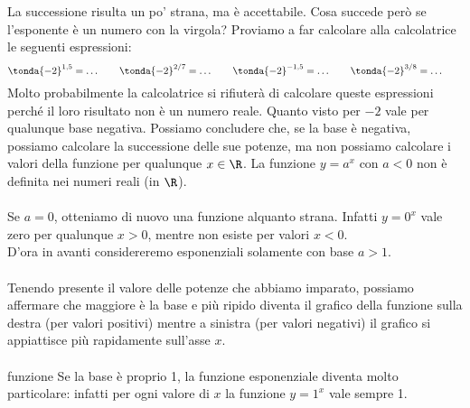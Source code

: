 La successione risulta un po' strana, ma è accettabile. Cosa succede però 
se 
l'esponente è un numero con la virgola? Proviamo a far calcolare alla 
calcolatrice le seguenti espressioni:
\[\tonda{-2}^{1,5}= \dots \qquad \tonda{-2}^{2/7}= \dots \qquad 
 \tonda{-2}^{-1,5}= \dots \qquad \tonda{-2}^{3/8}= \dots \qquad 
\]
Molto probabilmente la calcolatrice si rifiuterà di calcolare queste 
espressioni perché il loro risultato non è un numero reale. 
Quanto visto per \(-2\) vale per qualunque base negativa.
Possiamo concludere che, se la base è negativa, possiamo calcolare la 
successione 
delle sue potenze, ma non possiamo calcolare i valori della funzione 
per qualunque \(x \in \R\). 
La funzione \(y=a^x \text{ con } a<0\) non è definita nei numeri reali 
(in \(\R\)).
\paragraph{} Se \(a=0\), otteniamo di nuovo una funzione 
alquanto strana. Infatti \(y = 0^x\) vale
zero per qualunque \(x>0\), mentre non esiste per valori \(x<0\).\\[4pt]

D'ora in avanti considereremo esponenziali solamente con base \(a>1\).

\paragraph{}
Tenendo presente il valore delle potenze che abbiamo imparato, possiamo 
affermare che maggiore è la base e più ripido diventa il grafico della 
funzione 
sulla destra (per valori positivi) mentre a sinistra (per valori negativi) 
il 
grafico si appiattisce più rapidamente sull'asse \(x\).
\paragraph{}
funzione 
Se la base è proprio 1, la funzione esponenziale 
diventa molto particolare: infatti per ogni valore di \(x\) la funzione 
\(y=1^x\) vale sempre 1.

